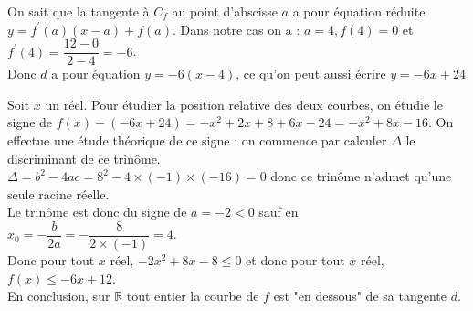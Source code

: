 \documentclass[12pt,a4paper]{book}
\begin{document}
\begin{enumMet}
    \item On sait que la tangente à $C_{f}$ au point d'abscisse $a$ a pour équation réduite $y=f^{\prime}(a)(x-a)+f(a)$. Dans notre cas on a : $a=4, f(4)=0$ et $f^{\prime}(4)=\dfrac{12-0}{2-4}=-6$.\\ Donc $d$ a pour équation $y=-6(x-4)$, ce qu'on peut aussi écrire
$y=-6 x+24$
\item Soit $x$ un réel. Pour étudier la position relative des deux courbes, on étudie le signe de
$f(x)-(-6 x+24)=-x^{2}+2 x+8+6 x-24=-x^{2}+8 x-16$. On effectue une étude théorique de ce signe : on commence par calculer $\Delta$ le discriminant de ce trinôme.\\
$\Delta=b^{2}-4 a c=8^{2}-4 \times(-1) \times(-16)=0$ donc ce trinôme n'admet qu'une seule racine réelle.\\
Le trinôme est donc du signe de $a=-2<0$ sauf en $x_{0}=-\dfrac{b}{2 a}=-\dfrac{8}{2 \times(-1)}=4$.\\
Donc pour tout $x$ réel, $-2 x^{2}+8 x-8 \leqslant 0$ et donc pour
tout $x$ réel, $f(x) \leqslant-6 x+12$.\\
En conclusion, sur $\mathbb{R}$ tout entier la courbe de $f$ est "en dessous" de sa tangente $d$.
\end{enumMet}

\end{document}
